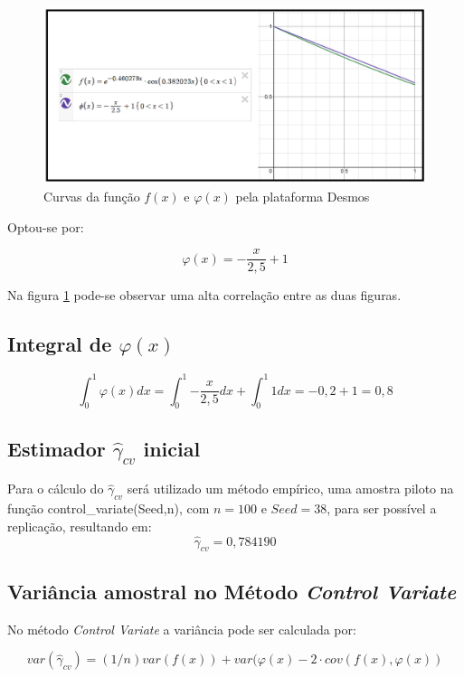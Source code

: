 \documentclass{article}
\begin{document}
\begin{figure}[H]
    \centering
    \includegraphics[width=.7\linewidth]{Imagens/Desmos_ControlVariate.png}
    \caption{Curvas da função $f(x)$ e $\varphi(x)$ pela plataforma Desmos}
    \label{fig:ControlVar_desmos}
\end{figure}

Optou-se por:

\begin{equation*}
    \varphi(x) = -\frac{x}{2,5}+1
\end{equation*}

Na figura \ref{fig:ControlVar_desmos} pode-se observar uma alta correlação entre as duas figuras.

\subsection{Integral de $\varphi(x)$}

\begin{equation*}
    \int_0^1{\varphi(x) dx} = \int_0^1{-\frac{x}{2,5}}dx+\int_0^1{1}dx = -0,2 + 1 = 0,8
\end{equation*}

\subsection{Estimador $\hat{\gamma}_{cv}$ inicial}
Para o cálculo do $\hat{\gamma}_{cv}$ será utilizado um método empírico, uma amostra piloto na função control\_variate(Seed,n), com $n=100$ e $Seed=38$, para ser possível a replicação, resultando em:
\[
    \hat{\gamma}_{cv} = 0,784190
\]

\subsection{Variância amostral no Método \textit{Control Variate}}

No método \textit{Control Variate} a variância pode ser calculada por:

\begin{equation*}
    var(\hat{\gamma}_{cv}) = (1/n) var(f(x))+var(\varphi(x) - 2\cdot cov(f(x), \varphi(x))
\end{equation*}
\end{document}
